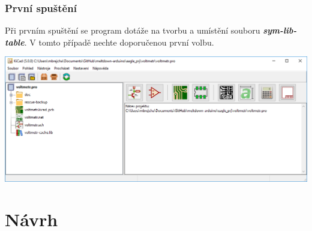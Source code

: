 \documentclass{beamer}
\begin{document}
	\begin{frame}
    \frametitle{První spuštění}
    \small
    Při prvním spuštění se program dotáže na tvorbu a umístění souboru \textit{\textbf{sym-lib-table}}. V tomto případě nechte doporučenou první volbu.
    \begin{center}
			\includegraphics[scale=0.4]{obr/kicad_nabidka.png}
		\end{center}
	\end{frame}
	
\section{\texorpdfstring{Návrh}{Navrh}}
\end{document}
